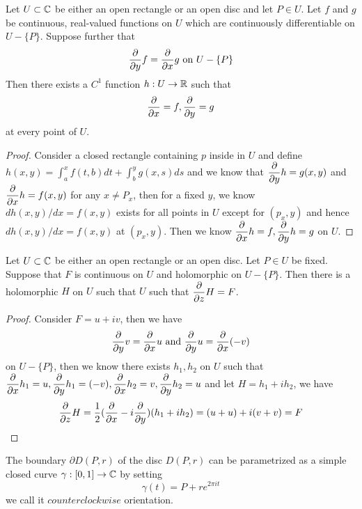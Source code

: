 \begin{theorem}
    Let $U\subset \mathbb{C}$ be either an open rectangle or an open disc and let $P\in U$. Let $f$ and $g$ be continuous, real-valued functions on $U$ which are continuously differentiable on $U-\{P\}$. Suppose further that
    \[\dfrac{\partial}{\partial y} f = \dfrac{\partial}{\partial x} g\text{ on }U-\{P\}\]
    Then there exists a $C^1$ function $h:U\to\mathbb{R}$ such that
    \[\dfrac{\partial}{\partial x} = f, \dfrac{\partial}{\partial y} = g\]
    at every point of $U$.
\end{theorem}
\begin{proof}\par
    Consider a closed rectangle containing $p$ inside in $U$ and define $h(x,y) = \int_a^x f(t,b)dt + \int_b^y g(x,s)ds$ and we know that $\dfrac{\partial}{\partial y} h = g(x,y)$ and $\dfrac{\partial}{\partial x} h = f(x,y)$ for any $x\neq P_x$, then for a fixed $y$, we know $dh(x,y)/dx= f(x,y)$ exists for all points in $U$ except for $(p_x,y)$ and hence $dh(x,y)/dx = f(x,y)$ at $(p_x,y)$. Then we know $\dfrac{\partial}{\partial x} h = f, \dfrac{\partial}{\partial y} h = g$ on $U$.
\end{proof}

\begin{theorem}
    Let $U\subset\mathbb{C}$ be either an open rectangle or an open disc. Let $P\in U$ be fixed. Suppose that $F$ is continuous on $U$ and holomorphic on $U-\{P\}$. Then there is a holomorphic $H$ on $U$ such that $U$ such that $\dfrac{\partial}{\partial z} H = F$.    
\end{theorem}
\begin{proof}\par
    Consider $F = u+iv$, then we have
    \[\dfrac{\partial}{\partial y} v = \dfrac{\partial}{\partial x} u\text{ and } \dfrac{\partial}{\partial y} u = \dfrac{\partial}{\partial x} (-v)\]
    on $U-\{P\}$, then we know there exists $h_1,h_2$ on $U$ such that $\dfrac{\partial}{\partial x} h_1 = u, \dfrac{\partial}{\partial y} h_1 = (-v), \dfrac{\partial}{\partial x} h_2 = v, \dfrac{\partial}{\partial y} h_2 = u$
    and let $H = h_1 + ih_2$, we have
    \[
    \dfrac{\partial}{\partial z} H = \dfrac{1}{2}(\dfrac{\partial}{\partial x} - i\dfrac{\partial}{\partial y})(h_1+ih_2) = (u+u) + i(v+v) = F
    \]
\end{proof}

\begin{definition}
    The boundary $\partial D(P,r)$ of the disc $D(P,r)$ can be parametrized as a simple closed curve $\gamma:[0,1]\to \mathbb{C}$ by setting
    \[\gamma(t) = P+re^{2\pi it}\]
    we call it $counterclockwise$ orientation.
\end{definition}

